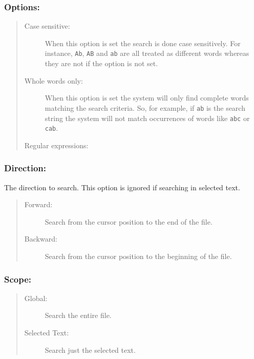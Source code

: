\subsubsection{Options:}

\begin{quote}
  \begin{footnotesize}
    \begin{description}
      \item[Case sensitive:]
        When this option is set the search is done case sensitively. For instance,
        \texttt{Ab}, \texttt{AB} and \texttt{ab} are all treated as different words
        whereas they are not if the option is not set.
      \item[Whole words only:]
        When this option is set the system will only find complete words matching
        the search criteria. So, for example, if \texttt{ab} is the search string
        the system will not match occurrences of words like \texttt{abc} or
        \texttt{cab}.
      \item[Regular expressions:]
    \end{description}
  \end{footnotesize}
\end{quote}


\subsubsection{Direction:}

The direction to search. This option is ignored if searching in selected text.

\begin{quote}
  \begin{footnotesize}
    \begin{description}
      \item[Forward:]
        Search from the cursor position to the end of the file.
      \item[Backward:]
        Search from the cursor position to the beginning of the file.
    \end{description}
  \end{footnotesize}
\end{quote}


\subsubsection{Scope:}
\begin{quote}
  \begin{footnotesize}
    \begin{description}
      \item[Global:]
        Search the entire file.
      \item[Selected Text:]
        Search just the selected text.
    \end{description}
  \end{footnotesize}
\end{quote}


